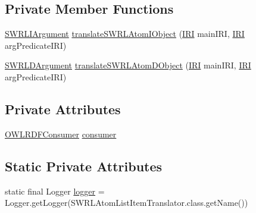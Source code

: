 \subsection*{Private Member Functions}
\begin{DoxyCompactItemize}
\item 
\hyperlink{interfaceorg_1_1semanticweb_1_1owlapi_1_1model_1_1_s_w_r_l_i_argument}{S\-W\-R\-L\-I\-Argument} \hyperlink{classorg_1_1coode_1_1owlapi_1_1rdfxml_1_1parser_1_1_s_w_r_l_atom_list_item_translator_a940b3f5332550b50a80213ae0e9012ed}{translate\-S\-W\-R\-L\-Atom\-I\-Object} (\hyperlink{classorg_1_1semanticweb_1_1owlapi_1_1model_1_1_i_r_i}{I\-R\-I} main\-I\-R\-I, \hyperlink{classorg_1_1semanticweb_1_1owlapi_1_1model_1_1_i_r_i}{I\-R\-I} arg\-Predicate\-I\-R\-I)
\item 
\hyperlink{interfaceorg_1_1semanticweb_1_1owlapi_1_1model_1_1_s_w_r_l_d_argument}{S\-W\-R\-L\-D\-Argument} \hyperlink{classorg_1_1coode_1_1owlapi_1_1rdfxml_1_1parser_1_1_s_w_r_l_atom_list_item_translator_aa5fea4fea972a9c71b5809d14e71eb90}{translate\-S\-W\-R\-L\-Atom\-D\-Object} (\hyperlink{classorg_1_1semanticweb_1_1owlapi_1_1model_1_1_i_r_i}{I\-R\-I} main\-I\-R\-I, \hyperlink{classorg_1_1semanticweb_1_1owlapi_1_1model_1_1_i_r_i}{I\-R\-I} arg\-Predicate\-I\-R\-I)
\end{DoxyCompactItemize}
\subsection*{Private Attributes}
\begin{DoxyCompactItemize}
\item 
\hyperlink{classorg_1_1coode_1_1owlapi_1_1rdfxml_1_1parser_1_1_o_w_l_r_d_f_consumer}{O\-W\-L\-R\-D\-F\-Consumer} \hyperlink{classorg_1_1coode_1_1owlapi_1_1rdfxml_1_1parser_1_1_s_w_r_l_atom_list_item_translator_af658748afc4b33bc79f38da077207f5c}{consumer}
\end{DoxyCompactItemize}
\subsection*{Static Private Attributes}
\begin{DoxyCompactItemize}
\item 
static final Logger \hyperlink{classorg_1_1coode_1_1owlapi_1_1rdfxml_1_1parser_1_1_s_w_r_l_atom_list_item_translator_a2c1863083de298455130919d2518f491}{logger} = Logger.\-get\-Logger(S\-W\-R\-L\-Atom\-List\-Item\-Translator.\-class.\-get\-Name())
\end{DoxyCompactItemize}


